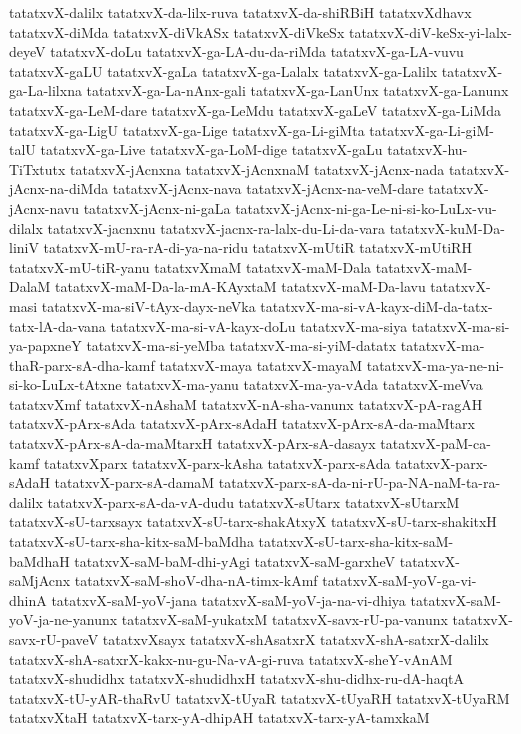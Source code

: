 {tatatxvX-dalilx
tatatxvX-da-lilx-ruva
tatatxvX-da-shiRBiH
tatatxvXdhavx
tatatxvX-diMda
tatatxvX-diVkASx
tatatxvX-diVkeSx
tatatxvX-diV-keSx-yi-lalx-deyeV
tatatxvX-doLu
tatatxvX-ga-LA-du-da-riMda
tatatxvX-ga-LA-vuvu
tatatxvX-gaLU
tatatxvX-gaLa
tatatxvX-ga-Lalalx
tatatxvX-ga-Lalilx
tatatxvX-ga-La-lilxna
tatatxvX-ga-La-nAnx-gali
tatatxvX-ga-LanUnx
tatatxvX-ga-Lanunx
tatatxvX-ga-LeM-dare
tatatxvX-ga-LeMdu
tatatxvX-gaLeV
tatatxvX-ga-LiMda
tatatxvX-ga-LigU
tatatxvX-ga-Lige
tatatxvX-ga-Li-giMta
tatatxvX-ga-Li-giM-talU
tatatxvX-ga-Live
tatatxvX-ga-LoM-dige
tatatxvX-gaLu
tatatxvX-hu-TiTxtutx
tatatxvX-jAcnxna
tatatxvX-jAcnxnaM
tatatxvX-jAcnx-nada
tatatxvX-jAcnx-na-diMda
tatatxvX-jAcnx-nava
tatatxvX-jAcnx-na-veM-dare
tatatxvX-jAcnx-navu
tatatxvX-jAcnx-ni-gaLa
tatatxvX-jAcnx-ni-ga-Le-ni-si-ko-LuLx-vu-dilalx
tatatxvX-jacnxnu
tatatxvX-jacnx-ra-lalx-du-Li-da-vara
tatatxvX-kuM-Da-liniV
tatatxvX-mU-ra-rA-di-ya-na-ridu
tatatxvX-mUtiR
tatatxvX-mUtiRH
tatatxvX-mU-tiR-yanu
tatatxvXmaM
tatatxvX-maM-Dala
tatatxvX-maM-DalaM
tatatxvX-maM-Da-la-mA-KAyxtaM
tatatxvX-maM-Da-lavu
tatatxvX-masi
tatatxvX-ma-siV-tAyx-dayx-neVka
tatatxvX-ma-si-vA-kayx-diM-da-tatx-tatx-lA-da-vana
tatatxvX-ma-si-vA-kayx-doLu
tatatxvX-ma-siya
tatatxvX-ma-si-ya-papxneY
tatatxvX-ma-si-yeMba
tatatxvX-ma-si-yiM-datatx
tatatxvX-ma-thaR-parx-sA-dha-kamf
tatatxvX-maya
tatatxvX-mayaM
tatatxvX-ma-ya-ne-ni-si-ko-LuLx-tAtxne
tatatxvX-ma-yanu
tatatxvX-ma-ya-vAda
tatatxvX-meVva
tatatxvXmf
tatatxvX-nAshaM
tatatxvX-nA-sha-vanunx
tatatxvX-pA-ragAH
tatatxvX-pArx-sAda
tatatxvX-pArx-sAdaH
tatatxvX-pArx-sA-da-maMtarx
tatatxvX-pArx-sA-da-maMtarxH
tatatxvX-pArx-sA-dasayx
tatatxvX-paM-ca-kamf
tatatxvXparx
tatatxvX-parx-kAsha
tatatxvX-parx-sAda
tatatxvX-parx-sAdaH
tatatxvX-parx-sA-damaM
tatatxvX-parx-sA-da-ni-rU-pa-NA-naM-ta-ra-dalilx
tatatxvX-parx-sA-da-vA-dudu
tatatxvX-sUtarx
tatatxvX-sUtarxM
tatatxvX-sU-tarxsayx
tatatxvX-sU-tarx-shakAtxyX
tatatxvX-sU-tarx-shakitxH
tatatxvX-sU-tarx-sha-kitx-saM-baMdha
tatatxvX-sU-tarx-sha-kitx-saM-baMdhaH
tatatxvX-saM-baM-dhi-yAgi
tatatxvX-saM-garxheV
tatatxvX-saMjAcnx
tatatxvX-saM-shoV-dha-nA-timx-kAmf
tatatxvX-saM-yoV-ga-vi-dhinA
tatatxvX-saM-yoV-jana
tatatxvX-saM-yoV-ja-na-vi-dhiya
tatatxvX-saM-yoV-ja-ne-yanunx
tatatxvX-saM-yukatxM
tatatxvX-savx-rU-pa-vanunx
tatatxvX-savx-rU-paveV
tatatxvXsayx
tatatxvX-shAsatxrX
tatatxvX-shA-satxrX-dalilx
tatatxvX-shA-satxrX-kakx-nu-gu-Na-vA-gi-ruva
tatatxvX-sheY-vAnAM
tatatxvX-shudidhx
tatatxvX-shudidhxH
tatatxvX-shu-didhx-ru-dA-haqtA
tatatxvX-tU-yAR-thaRvU
tatatxvX-tUyaR
tatatxvX-tUyaRH
tatatxvX-tUyaRM
tatatxvXtaH
tatatxvX-tarx-yA-dhipAH
tatatxvX-tarx-yA-tamxkaM
}
